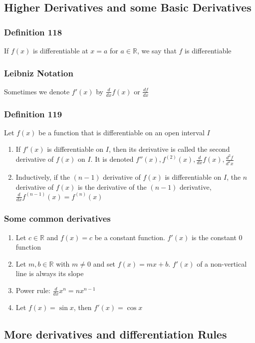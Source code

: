 \documentclass[12pt, letterpaper]{article}
\begin{document}
\subsection{Higher Derivatives and some Basic Derivatives}
\subsubsection*{Definition 118}
If $f(x)$ is differentiable at $x=a$ for $a\in\mathbb{R}$, we say that $f$ is differentiable
\subsubsection*{Leibniz Notation}
Sometimes we denote $f'(x)$ by $\frac{d}{dx} f(x)$ or $\frac{df}{dx}$
\subsubsection*{Definition 119}
Let $f(x)$ be a function that is differentiable on an open interval $I$
\begin{enumerate}
    \item If $f'(x)$ is differentiable on $I$, then its derivative is called the second derivative of $f(x)$ on $I$. It is denoted $f''(x), f^(2)(x), \frac{d}{dx} f(x), \frac{d^2f}{d^2x}$
    \item Inductively, if the $(n-1)$ derivative of $f(x)$ is differentiable on $I$, the $n$ derivative of $f(x)$ is the derivative of the $(n-1)$ derivative, $\frac{d}{dx} f^{(n-1)}(x) = f^{(n)}(x)$
\end{enumerate}
\subsubsection*{Some common derivatives}
\begin{enumerate}
    \item Let $c\in\mathbb{R}$ and $f(x) = c$ be a constant function. $f'(x)$ is the constant $0$ function
    \item Let $m,b \in\mathbb{R}$ with $m\neq 0$ and set $f(x) = mx+b$. $f'(x)$ of a non-vertical line is always its slope
    \item Power rule: $\frac{d}{dx} x^n = nx^{n-1}$
    \item Let $f(x) = \sin x$, then $f'(x) = \cos x$
\end{enumerate}
\subsection{More derivatives and differentiation Rules}
\end{document}
